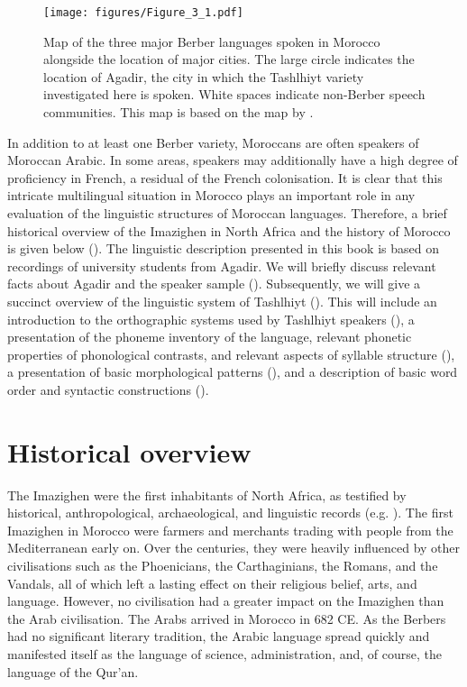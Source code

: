 \begin{figure}
   \texttt{[image: figures/Figure\_3\_1.pdf]}
  \caption{Map of the three major Berber languages spoken in Morocco alongside the location of major cities. The large circle indicates the location of Agadir, the city in which the Tashlhiyt variety investigated here is spoken. White spaces indicate non-Berber speech communities. This map is based on the map by \citet[203]{colin1937}.}
   \label{fig:3.1}
   \end{figure}

In addition to at least one Berber variety, Moroccans are often speakers of Moroccan Arabic. In some areas, speakers may additionally have a high degree of proficiency in French, a residual of the French colonisation. It is clear that this intricate multilingual situation in Morocco plays an important role in any evaluation of the linguistic structures of Moroccan languages. Therefore, a brief historical overview of the Imazighen in North Africa and the history of Morocco is given below (). The linguistic description presented in this book is based on recordings of university students from Agadir. We will briefly discuss relevant facts about Agadir and the speaker sample (). Subsequently, we will give a succinct overview of the linguistic system of Tashlhiyt (). This will include an introduction to the orthographic systems used by Tashlhiyt speakers (), a presentation of the phoneme inventory of the language, relevant phonetic properties of phonological contrasts, and relevant aspects of syllable structure (), a presentation of basic morphological patterns (), and a description of basic word order and syntactic constructions ().

\section{Historical overview}\label{sec:3.2}
The Imazighen were the first inhabitants of North Africa, as testified by historical, anthropological, archaeological, and linguistic records (e.g. \citealt{Julien1966,Laroui2015}). The first Imazighen in Morocco were farmers and merchants trading with people from the Mediterranean early on. Over the centuries, they were heavily influenced by other civilisations such as the Phoenicians, the Carthaginians, the Romans, and the Vandals, all of which left a lasting effect on their religious belief, arts, and language. However, no civilisation had a greater impact on the Imazighen than the Arab civilisation. The Arabs arrived in Morocco in 682 CE. As the Berbers had no significant literary tradition, the Arabic language spread quickly and manifested itself as the language of science, administration, and, of course, the language of the Qur’an.
 

